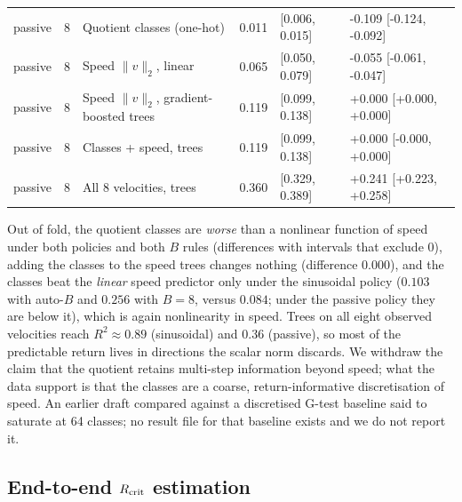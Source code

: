 \documentclass[10pt]{article}
\begin{document}
\begin{table}[t]
\begin{tabular}{llllll}
passive & 8 & Quotient classes (one-hot) & 0.011 & [0.006, 0.015] & -0.109 [-0.124, -0.092] \\
passive & 8 & Speed $\|v\|_2$, linear & 0.065 & [0.050, 0.079] & -0.055 [-0.061, -0.047] \\
passive & 8 & Speed $\|v\|_2$, gradient-boosted trees & 0.119 & [0.099, 0.138] & +0.000 [+0.000, +0.000] \\
passive & 8 & Classes + speed, trees & 0.119 & [0.099, 0.138] & +0.000 [-0.000, +0.000] \\
passive & 8 & All 8 velocities, trees & 0.360 & [0.329, 0.389] & +0.241 [+0.223, +0.258] \\
\bottomrule
\end{tabular}
\end{table}

Out of fold, the quotient classes are \emph{worse} than a nonlinear function of
speed under both policies and both $B$ rules (differences with intervals that
exclude $0$), adding the classes to the speed trees changes nothing
(difference $0.000$), and the classes beat the \emph{linear} speed predictor only under the
sinusoidal policy ($0.103$ with auto-$B$ and $0.256$ with $B=8$, versus $0.084$;
under the passive policy they are below it), which is again nonlinearity in
speed.  Trees on all eight observed velocities reach
$R^2\approx0.89$ (sinusoidal) and $0.36$ (passive), so most of the predictable
return lives in directions the scalar norm discards.  We withdraw the claim
that the quotient retains multi-step information beyond speed; what the data
support is that the classes are a coarse, return-informative discretisation of
speed.  An earlier draft compared against a discretised G-test baseline said to
saturate at 64 classes; no result file for that baseline exists and we do not
report it.

\subsection{End-to-end $R_{\rm crit}$ estimation}
\end{document}
